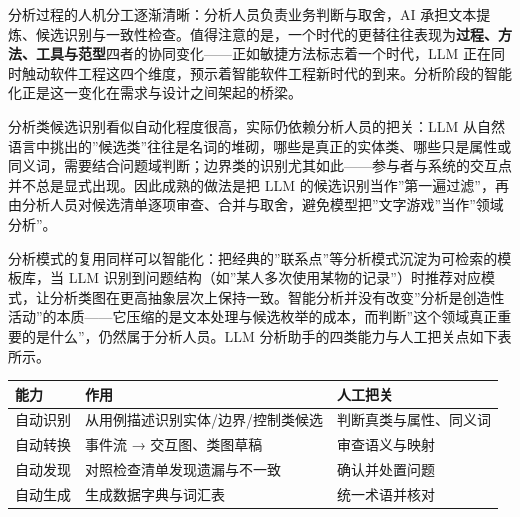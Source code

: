 \documentclass[12pt,a4paper,twoside,openany]{ctexbook}
\numberwithin{figure}{chapter}
\numberwithin{table}{chapter}
\newcounter{none}
\begin{document}
分析过程的人机分工逐渐清晰：分析人员负责业务判断与取舍，AI
承担文本提炼、候选识别与一致性检查。值得注意的是，一个时代的更替往往表现为\textbf{过程、方法、工具与范型}四者的协同变化------正如敏捷方法标志着一个时代，LLM
正在同时触动软件工程这四个维度，预示着智能软件工程新时代的到来。分析阶段的智能化正是这一变化在需求与设计之间架起的桥梁。

分析类候选识别看似自动化程度很高，实际仍依赖分析人员的把关：LLM
从自然语言中挑出的''候选类''往往是名词的堆砌，哪些是真正的实体类、哪些只是属性或同义词，需要结合问题域判断；边界类的识别尤其如此------参与者与系统的交互点并不总是显式出现。因此成熟的做法是把
LLM
的候选识别当作''第一遍过滤''，再由分析人员对候选清单逐项审查、合并与取舍，避免模型把''文字游戏''当作''领域分析''。

分析模式的复用同样可以智能化：把经典的''联系点''等分析模式沉淀为可检索的模板库，当
LLM
识别到问题结构（如''某人多次使用某物的记录''）时推荐对应模式，让分析类图在更高抽象层次上保持一致。智能分析并没有改变''分析是创造性活动''的本质------它压缩的是文本处理与候选枚举的成本，而判断''这个领域真正重要的是什么''，仍然属于分析人员。LLM
分析助手的四类能力与人工把关点如下表所示。

{\def\LTcaptype{none} %
\begin{longtable}[]{@{}
  >{\raggedright\arraybackslash}p{}
  >{\raggedright\arraybackslash}p{}
  >{\raggedright\arraybackslash}p{}@{}}
\toprule\noalign{}
\begin{minipage}[b]{\linewidth}\raggedright
能力
\end{minipage} & \begin{minipage}[b]{\linewidth}\raggedright
作用
\end{minipage} & \begin{minipage}[b]{\linewidth}\raggedright
人工把关
\end{minipage} \\
\midrule\noalign{}
\endhead
\bottomrule\noalign{}
\endlastfoot
自动识别 & 从用例描述识别实体/边界/控制类候选 &
判断真类与属性、同义词 \\
自动转换 & 事件流 → 交互图、类图草稿 & 审查语义与映射 \\
自动发现 & 对照检查清单发现遗漏与不一致 & 确认并处置问题 \\
自动生成 & 生成数据字典与词汇表 & 统一术语并核对 \\
\end{longtable}
}
\end{document}
